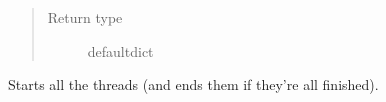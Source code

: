 \documentclass[letterpaper,10pt,english]{sphinxmanual}
\begin{document}
\begin{fulllineitems}
\begin{fulllineitems}
\begin{quote}
\begin{description}
\item[{Return type}] \leavevmode
defaultdict

\end{description}\end{quote}

\end{fulllineitems}


\begin{fulllineitems}
\label{src.mapping:src.mapping.mapthreading.MappingMasterThread.start_threads}
Starts all the threads (and ends them if they're all finished).

\end{fulllineitems}


\end{fulllineitems}

\end{document}
